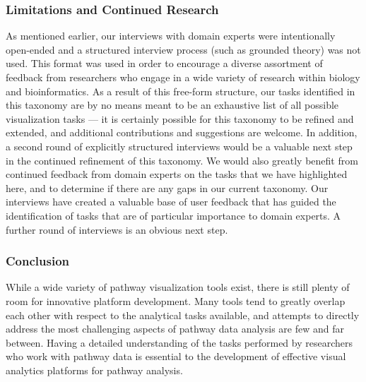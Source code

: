 \documentclass[twocolumn]{bmcart}%
\begin{document}
\subsubsection*{Limitations and Continued Research}

As mentioned earlier, our interviews with domain experts were intentionally open-ended and a structured interview process (such as grounded theory) was not used.
This format was used in order to encourage a diverse assortment of feedback from researchers who engage in a wide variety of research within biology and bioinformatics.
As a result of this free-form structure, our tasks identified in this taxonomy are by no means meant to be an exhaustive list of all possible visualization tasks --- it is certainly possible for this taxonomy to be refined and extended, and additional contributions and suggestions are welcome.
In addition, a second round of explicitly structured interviews would be a valuable next step in the continued refinement of this taxonomy.
We would also greatly benefit from continued feedback from domain experts on the tasks that we have highlighted here, and to determine if there are any gaps in our current taxonomy.
Our interviews have created a valuable base of user feedback that has guided the identification of tasks that are of particular importance to domain experts.
A further round of interviews is an obvious next step.

\subsubsection*{Conclusion}

While a wide variety of pathway visualization tools exist, there is still plenty of room for innovative platform development.
Many tools tend to greatly overlap each other with respect to the analytical tasks available, and attempts to directly address the most challenging aspects of pathway data analysis are few and far between.
Having a detailed understanding of the tasks performed by researchers who work with pathway data is essential to the development of effective visual analytics platforms for pathway analysis.
\end{document}
